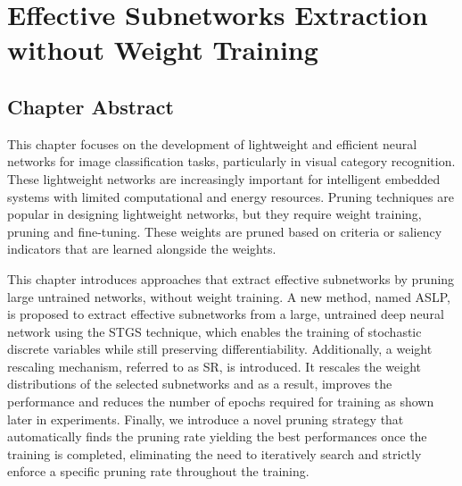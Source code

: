 \chapter{Effective Subnetworks Extraction without Weight Training}
\label{chap:chapter2}


\localtableofcontents


\begin{adjustwidth}{1.5cm}{1.5cm}
  {
  \let\oldsection\section
  \renewcommand\section[1]{\oldsection*{\centering #1}}
  \section{Chapter Abstract}
    }  
  This chapter focuses on the development of lightweight and efficient neural
  networks for image classification tasks, particularly in visual category
  recognition. These lightweight networks are increasingly important for
  intelligent embedded systems with limited computational and energy resources.
  Pruning techniques are popular in designing lightweight networks, but they
  require weight training, pruning and fine-tuning. These weights are pruned
  based on criteria or saliency indicators that are learned alongside the
  weights.
  
  This chapter introduces approaches that extract effective subnetworks by
  pruning large untrained networks, without weight training. A new method, named
  \acf{ASLP}, is proposed to extract effective subnetworks from a large,
  untrained deep neural network using the \acf{STGS} technique, which enables
  the training of stochastic discrete variables while still preserving
  differentiability. Additionally, a weight rescaling mechanism, referred to as
  \acf{SR}, is introduced. It rescales the weight distributions of the selected
  subnetworks and as a result, improves the performance and reduces the number
  of epochs required for training as shown later in experiments. Finally, we
  introduce a novel pruning strategy that automatically finds the pruning rate
  yielding the best performances once the training is completed, eliminating the
  need to iteratively search and strictly enforce a specific pruning rate
  throughout the training.


\end{adjustwidth}
